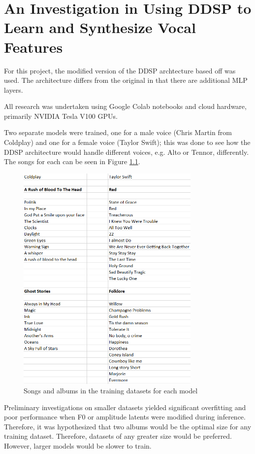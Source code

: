 \chapter{An Investigation in Using DDSP to Learn and Synthesize Vocal Features}

For this project, the modified version of the DDSP archtecture based off \cite{SingingDDSP} was used. The architecture differs from the original in that there are additional MLP layers.

All research was undertaken using Google Colab notebooks and cloud hardware, primarily NVIDIA Tesla V100 GPUs.

Two separate models were trained, one for a male voice (Chris Martin from Coldplay) and one for a female voice (Taylor Swift); this was done to see how the DDSP architecture would handle different voices, e.g. Alto or Tennor, differently. The songs for each can be seen in Figure \ref{fig:DatasetSongs}.

\begin{figure}[H]
    \centering
    \includegraphics[width=0.8\textwidth]{research/dataset_preparation/DatasetSongs.png}
    \caption{Songs and albums in the training datasets for each model}
    \label{fig:DatasetSongs}
\end{figure}

Preliminary investigations on smaller datasets yielded significant overfitting and poor performance when F0 or amplitude latents were modified during inference. Therefore, it was hypothesized that two albums would be the optimal size for any training dataset. Therefore, datasets of any greater size would be preferred. However, larger models would be slower to train.





